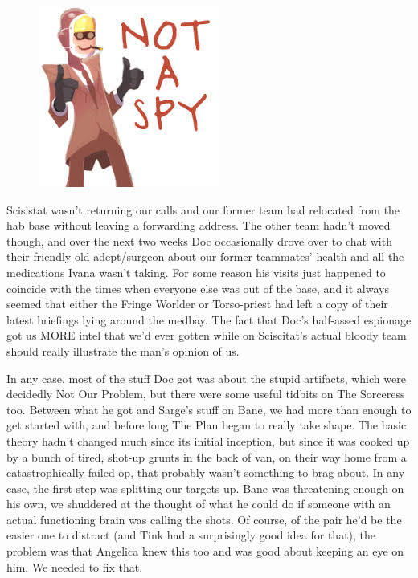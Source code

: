 \begin{figure}
	\begin{center}
		\includegraphics[width=\figwidth]{pics/19/28.png}
	\end{center}
\end{figure}
Scisistat wasn't returning our calls and our former team had relocated from the hab base without leaving a forwarding address. 
The other team hadn't moved though, and over the next two weeks Doc occasionally drove over to chat with their friendly old adept/surgeon about our former teammates' health and all the medications Ivana wasn't taking. 
For some reason his visits just happened to coincide with the times when everyone else was out of the base, and it always seemed that either the Fringe Worlder or Torso-priest had left a copy of their latest briefings lying around the medbay. 
The fact that Doc's half-assed espionage got us MORE intel that we'd ever gotten while on Sciscitat's actual bloody team should really illustrate the man's opinion of us.

In any case, most of the stuff Doc got was about the stupid artifacts, which were decidedly Not Our Problem, but there were some useful tidbits on The Sorceress too. 
Between what he got and Sarge's stuff on Bane, we had more than enough to get started with, and before long The Plan began to really take shape. 
The basic theory hadn't changed much since its initial inception, but since it was cooked up by a bunch of tired, shot-up grunts in the back of van, on their way home from a catastrophically failed op, that probably wasn't something to brag about. 
In any case, the first step was splitting our targets up. 
Bane was threatening enough on his own, we shuddered at the thought of what he could do if someone with an actual functioning brain was calling the shots. 
Of course, of the pair he'd be the easier one to distract (and Tink had a surprisingly good idea for that), the problem was that Angelica knew this too and was good about keeping an eye on him. 
We needed to fix that.

